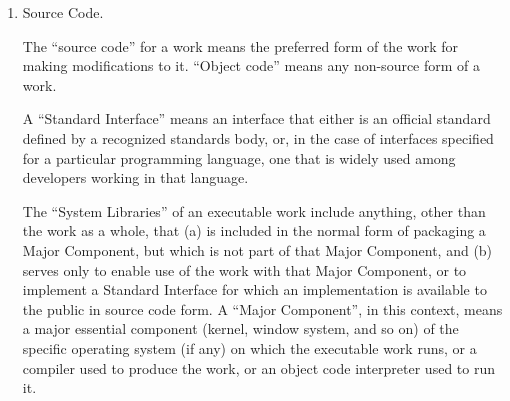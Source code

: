 {\begin{enumerate}
	To ``modify'' a work means to copy from or adapt all or part of the work
	in a fashion requiring copyright permission, other than the making of an
	exact copy.  The resulting work is called a ``modified version'' of the
	earlier work or a work ``based on'' the earlier work.
	
	A ``covered work'' means either the unmodified Program or a work based
	on the Program.
	
	To ``propagate'' a work means to do anything with it that, without
	permission, would make you directly or secondarily liable for
	infringement under applicable copyright law, except executing it on a
	computer or modifying a private copy.  Propagation includes copying,
	distribution (with or without modification), making available to the
	public, and in some countries other activities as well.
	
	To ``convey'' a work means any kind of propagation that enables other
	parties to make or receive copies.  Mere interaction with a user through
	a computer network, with no transfer of a copy, is not conveying.
	
	An interactive user interface displays ``Appropriate Legal Notices''
	to the extent that it includes a convenient and prominently visible
	feature that (1) displays an appropriate copyright notice, and (2)
	tells the user that there is no warranty for the work (except to the
	extent that warranties are provided), that licensees may convey the
	work under this License, and how to view a copy of this License.  If
	the interface presents a list of user commands or options, such as a
	menu, a prominent item in the list meets this criterion.
	
	\item Source Code.
	
	The ``source code'' for a work means the preferred form of the work
	for making modifications to it.  ``Object code'' means any non-source
	form of a work.
	
	A ``Standard Interface'' means an interface that either is an official
	standard defined by a recognized standards body, or, in the case of
	interfaces specified for a particular programming language, one that
	is widely used among developers working in that language.
	
	The ``System Libraries'' of an executable work include anything, other
	than the work as a whole, that (a) is included in the normal form of
	packaging a Major Component, but which is not part of that Major
	Component, and (b) serves only to enable use of the work with that
	Major Component, or to implement a Standard Interface for which an
	implementation is available to the public in source code form.  A
	``Major Component'', in this context, means a major essential component
	(kernel, window system, and so on) of the specific operating system
	(if any) on which the executable work runs, or a compiler used to
	produce the work, or an object code interpreter used to run it.
	

\end{enumerate}}
